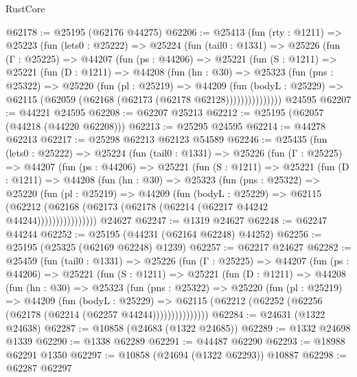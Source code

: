 \begin{lexlean}{RustCore}
\begin{coremodule}
@62178 := @25195 (@62176 @44275)
@62206 := @25413
    (fun (rty : @1211) =>
    @25223
      (fun (lets0 : @25222) =>
      @25224
        (fun (tail0 : @1331) =>
        @25226
          (fun (Γ : @25225) =>
          @44207
            (fun (ps : @44206) =>
            @25221
              (fun (S : @1211) =>
              @25221
                (fun (D : @1211) =>
                @44208
                  (fun (hn : @30) =>
                  @25323
                    (fun (pns : @25322) =>
                    @25220
                      (fun (pl : @25219) =>
                      @44209
                        (fun (bodyL : @25229) =>
                        @62115 (@62059 (@62168 (@62173 (@62178 @62128)))))))))))))))
    @24595
@62207 := @44221 @24595
@62208 := @62207 @25213
@62212 := @25195 (@62057 (@44218 (@44220 @62208)))
@62213 := @25295 @24595
@62214 := @44278 @62213
@62217 := @25298 @62213 @62123 @54589
@62246 := @25435
    (fun (lets0 : @25222) =>
    @25224
      (fun (tail0 : @1331) =>
      @25226
        (fun (Γ : @25225) =>
        @44207
          (fun (ps : @44206) =>
          @25221
            (fun (S : @1211) =>
            @25221
              (fun (D : @1211) =>
              @44208
                (fun (hn : @30) =>
                @25323
                  (fun (pns : @25322) =>
                  @25220
                    (fun (pl : @25219) =>
                    @44209
                      (fun (bodyL : @25229) =>
                      @62115
                        (@62212
                          (@62168 (@62173 (@62178 (@62214 (@62217 @44242 @44244))))))))))))))))
    @24627
@62247 := @1319 @24627
@62248 := @62247 @44244
@62252 := @25195 (@44231 (@62164 @62248) @44252)
@62256 := @25195 (@25325 (@62169 @62248) @1239)
@62257 := @62217 @24627
@62282 := @25459
    (fun (tail0 : @1331) =>
    @25226
      (fun (Γ : @25225) =>
      @44207
        (fun (ps : @44206) =>
        @25221
          (fun (S : @1211) =>
          @25221
            (fun (D : @1211) =>
            @44208
              (fun (hn : @30) =>
              @25323
                (fun (pns : @25322) =>
                @25220
                  (fun (pl : @25219) =>
                  @44209
                    (fun (bodyL : @25229) =>
                    @62115 (@62212 (@62252 (@62256 (@62178 (@62214 (@62257 @44244)))))))))))))))
@62284 := @24631 (@1322 @24638)
@62287 := @10858 (@24683 (@1322 @24685))
@62289 := @1332 @24698 @1339
@62290 := @1338 @62289
@62291 := @44487 @62290
@62293 := @18988 @62291 @1350
@62297 := @10858 (@24694 (@1322 @62293)) @10887
@62298 := @62287 @62297

\end{coremodule}
\end{lexlean}
